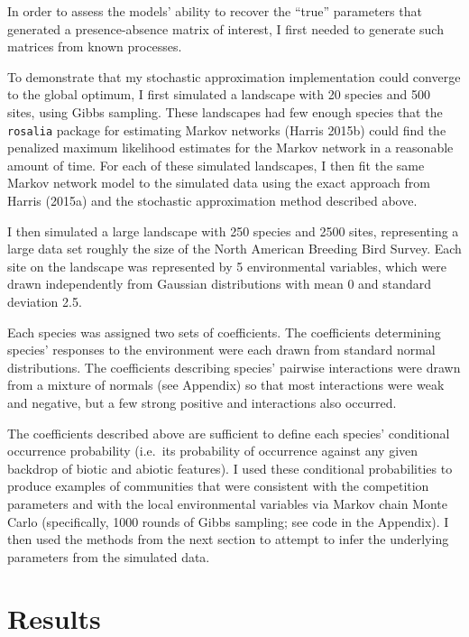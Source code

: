\documentclass[12pt,]{article}
\begin{document}
\begin{spacing}{1.9}
\begin{flushleft}
In order to assess the models' ability to recover the ``true''
parameters that generated a presence-absence matrix of interest, I first
needed to generate such matrices from known processes.

To demonstrate that my stochastic approximation implementation could
converge to the global optimum, I first simulated a landscape with 20
species and 500 sites, using Gibbs sampling. These landscapes had few
enough species that the \texttt{rosalia} package for estimating Markov
networks (Harris 2015b) could find the penalized maximum likelihood
estimates for the Markov network in a reasonable amount of time. For
each of these simulated landscapes, I then fit the same Markov network
model to the simulated data using the exact approach from Harris (2015a)
and the stochastic approximation method described above.

I then simulated a large landscape with 250 species and 2500 sites,
representing a large data set roughly the size of the North American
Breeding Bird Survey. Each site on the landscape was represented by 5
environmental variables, which were drawn independently from Gaussian
distributions with mean 0 and standard deviation 2.5.

Each species was assigned two sets of coefficients. The coefficients
determining species' responses to the environment were each drawn from
standard normal distributions. The coefficients describing species'
pairwise interactions were drawn from a mixture of normals (see
Appendix) so that most interactions were weak and negative, but a few
strong positive and interactions also occurred.

The coefficients described above are sufficient to define each species'
conditional occurrence probability (i.e.~its probability of occurrence
against any given backdrop of biotic and abiotic features). I used these
conditional probabilities to produce examples of communities that were
consistent with the competition parameters and with the local
environmental variables via Markov chain Monte Carlo (specifically, 1000
rounds of Gibbs sampling; see code in the Appendix). I then used the
methods from the next section to attempt to infer the underlying
parameters from the simulated data.

\section{Results}\label{results}


\end{flushleft}
\end{spacing}
\end{document}
